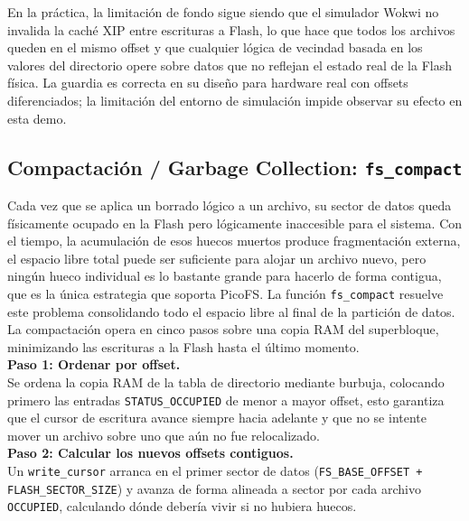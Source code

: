 \documentclass[12pt,letterpaper]{article}
\begin{document}
En la práctica, la limitación de fondo sigue siendo que el simulador Wokwi no invalida la caché XIP entre
escrituras a Flash, lo que hace que todos los archivos queden en el mismo offset y que cualquier lógica de
vecindad basada en los valores del directorio opere sobre datos que no reflejan el estado real de la Flash
física. La guardia es correcta en su diseño para hardware real con offsets diferenciados; la limitación del
entorno de simulación impide observar su efecto en esta demo.


\subsection*{Compactación / Garbage Collection: \texttt{fs\_compact}}
Cada vez que se aplica un borrado lógico a un archivo, su sector de datos queda físicamente ocupado en la Flash
pero lógicamente inaccesible para el sistema. Con el tiempo, la acumulación de esos huecos muertos produce
fragmentación externa, el espacio libre total puede ser suficiente para alojar un archivo nuevo, pero ningún
hueco individual es lo bastante grande para hacerlo de forma contigua, que es la única estrategia que soporta
PicoFS. La función \texttt{fs\_compact} resuelve este problema consolidando todo el espacio libre al final de la
partición de datos.\\

La compactación opera en cinco pasos sobre una copia RAM del superbloque, minimizando las escrituras a la Flash
hasta el último momento.\\

\textbf{Paso 1: Ordenar por offset.}\\
Se ordena la copia RAM de la tabla de directorio mediante burbuja, colocando primero las entradas
\texttt{STATUS\_OCCUPIED} de menor a mayor offset, esto garantiza que el cursor de escritura avance siempre
hacia adelante y que no se intente mover un archivo sobre uno que aún no fue relocalizado.\\

\textbf{Paso 2: Calcular los nuevos offsets contiguos.}\\
Un \texttt{write\_cursor} arranca en el primer sector de datos (\texttt{FS\_BASE\_OFFSET + FLASH\_SECTOR\_SIZE})
y avanza de forma alineada a sector por cada archivo \texttt{OCCUPIED}, calculando dónde debería vivir si no
hubiera huecos.\\
\end{document}

